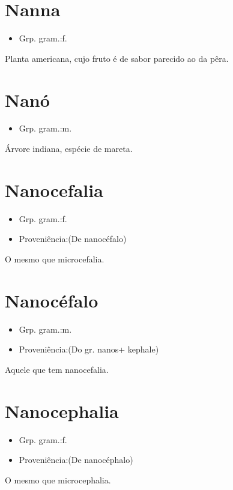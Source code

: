 \section{Nanna}
\begin{itemize}
\item {Grp. gram.:f.}
\end{itemize}
Planta americana, cujo fruto é de sabor parecido ao da pêra.
\section{Nanó}
\begin{itemize}
\item {Grp. gram.:m.}
\end{itemize}
Árvore indiana, espécie de mareta.
\section{Nanocefalia}
\begin{itemize}
\item {Grp. gram.:f.}
\end{itemize}
\begin{itemize}
\item {Proveniência:(De \textunderscore nanocéfalo\textunderscore )}
\end{itemize}
O mesmo que \textunderscore microcefalia\textunderscore .
\section{Nanocéfalo}
\begin{itemize}
\item {Grp. gram.:m.}
\end{itemize}
\begin{itemize}
\item {Proveniência:(Do gr. \textunderscore nanos\textunderscore  + \textunderscore kephale\textunderscore )}
\end{itemize}
Aquele que tem nanocefalia.
\section{Nanocephalia}
\begin{itemize}
\item {Grp. gram.:f.}
\end{itemize}
\begin{itemize}
\item {Proveniência:(De \textunderscore nanocéphalo\textunderscore )}
\end{itemize}
O mesmo que \textunderscore microcephalia\textunderscore .
